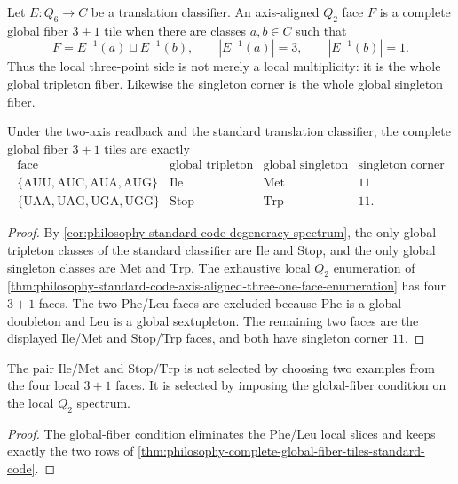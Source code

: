 \begin{definition}
\label{def:philosophy-complete-global-fiber-three-one-tile}
Let $E:Q_{6}\to C$ be a translation classifier. An axis-aligned
$Q_{2}$ face $F$ is a complete global fiber $3+1$ tile when there are
classes $a,b\in C$ such that
$$
  F=E^{-1}(a)\sqcup E^{-1}(b),
  \qquad
  |E^{-1}(a)|=3,
  \qquad
  |E^{-1}(b)|=1.
$$
Thus the local three-point side is not merely a local multiplicity:
it is the whole global tripleton fiber. Likewise the singleton corner is
the whole global singleton fiber.
\end{definition}

\begin{theorem}
\label{thm:philosophy-complete-global-fiber-tiles-standard-code}
Under the two-axis readback and the standard translation classifier, the
complete global fiber $3+1$ tiles are exactly
$$
\begin{array}{c|c|c|c}
  \text{face} & \text{global tripleton} & \text{global singleton}
    & \text{singleton corner}\\
\hline
  \{\mathrm{AUU},\mathrm{AUC},\mathrm{AUA},\mathrm{AUG}\}
    & \mathrm{Ile} & \mathrm{Met} & 11\\
  \{\mathrm{UAA},\mathrm{UAG},\mathrm{UGA},\mathrm{UGG}\}
    & \mathrm{Stop} & \mathrm{Trp} & 11.
\end{array}
$$
\end{theorem}
\begin{proof}
By \autoref{cor:philosophy-standard-code-degeneracy-spectrum}, the only
global tripleton classes of the standard classifier are $\mathrm{Ile}$
and $\mathrm{Stop}$, and the only global singleton classes are
$\mathrm{Met}$ and $\mathrm{Trp}$. The exhaustive local $Q_{2}$
enumeration of \autoref{thm:philosophy-standard-code-axis-aligned-three-one-face-enumeration}
has four $3+1$ faces. The two Phe/Leu faces are excluded because
$\mathrm{Phe}$ is a global doubleton and $\mathrm{Leu}$ is a global
sextupleton. The remaining two faces are the displayed Ile/Met and
Stop/Trp faces, and both have singleton corner $11$.
\end{proof}

\begin{corollary}
\label{cor:philosophy-global-fibers-select-dual-control-tiles}
The pair $\mathrm{Ile}/\mathrm{Met}$ and $\mathrm{Stop}/\mathrm{Trp}$ is
not selected by choosing two examples from the four local $3+1$ faces.
It is selected by imposing the global-fiber condition on the local
$Q_{2}$ spectrum.
\end{corollary}
\begin{proof}
The global-fiber condition eliminates the Phe/Leu local slices and keeps
exactly the two rows of
\autoref{thm:philosophy-complete-global-fiber-tiles-standard-code}.
\end{proof}

